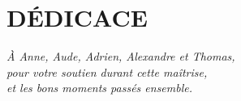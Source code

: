 \chapter*{DÉDICACE}\thispagestyle{headings}
\begin{flushright}
  \itshape
  À Anne, Aude, Adrien, Alexandre et Thomas,\\
  pour votre soutien durant cette maîtrise,\\
  et les bons moments passés ensemble.

\end{flushright}
